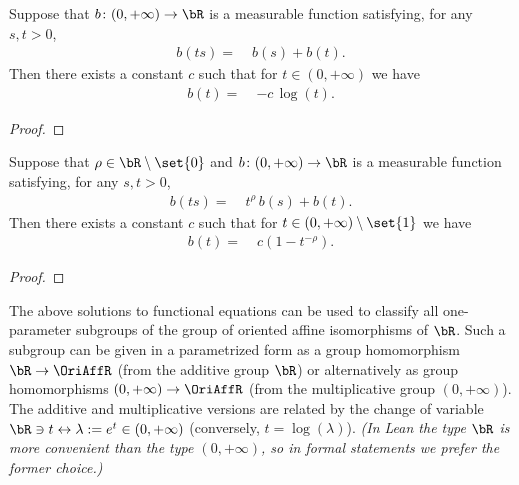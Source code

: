 \begin{lemma}[Functional equation translation coefficient solution with $\rho = 0$]
  \label{lem:solution-functional-eqn-translation-no-scaling}
  Suppose that
  $b \colon (0,+\infty) \to \bR$ is a measurable function
  satisfying, for any $s, t > 0$,
  \begin{align*}
    b(t s) = \; & b(s) + b(t) .
  \end{align*}
  Then there exists a constant $c$ such that for $t \in (0,+\infty)$
  we have
  \begin{align*}
    b(t) = \; & -c \, \log (t) .
  \end{align*}
\end{lemma}
\begin{proof}
\end{proof}

\begin{lemma}
  \label{lem:solution-functional-eqn-translation-with-scaling}
  Suppose that $\rho \in \bR \setminus \set{0}$ and
  $b \colon (0,+\infty) \to \bR$ is a measurable function
  satisfying, for any $s, t > 0$,
  \begin{align*}
    b(t s) = \; & t^{\rho} \, b(s) + b(t) .
  \end{align*}
  Then there exists a constant $c$ such that for $t \in (0,+\infty) \setminus \set{1}$
  we have
  \begin{align*}
    b(t) = \; & c (1 - t^{-\rho}) .
  \end{align*}
\end{lemma}
\begin{proof}
\end{proof}

The above solutions to functional equations can be used to classify all
one-parameter subgroups of the group of oriented affine isomorphisms of $\bR$.
Such a subgroup can be given in a parametrized form as a group homomorphism
$\bR \to \OriAffR$ (from the additive group $\bR$) or alternatively
as group homomorphisms $(0,+\infty) \to \OriAffR$ (from the multiplicative
group $(0,+\infty)$). The additive and multiplicative versions are
related by the change of variable
$\bR \ni t \leftrightarrow \lambda := e^t \in (0,+\infty)$
(conversely, $t = \log(\lambda)$).
\emph{(In Lean the type $\bR$ is more convenient than the type $(0,+\infty)$,
so in formal statements we prefer the former choice.)}

